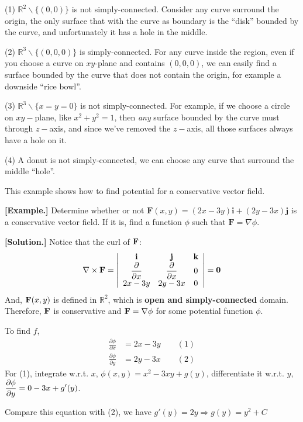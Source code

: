 \documentclass[11pt, a4paper]{MATH2023}
\newcommand{\eg}{\textbf{[Example.] }}
\newcommand{\sol}{\textbf{[Solution.] }}
\newcommand{\ii}{{\bf i}}
\newcommand{\jj}{{\bf j}}
\newcommand{\kk}{{\bf k}}
\newcommand{\FF}{{\bf F}}
\newcommand{\pt}{\partial}
\begin{document}
\begin{spacing}{1.3}
    (1) $\mathbb{R}^2\backslash \{(0,0)\}$ is not simply-connected. Consider any curve surround the origin,
    the only surface that with the curve as boundary is the ``disk'' bounded by the curve, and unfortunately 
    it has a hole in the middle.

    (2) $\mathbb{R}^3\backslash \{(0,0,0)\}$ is simply-connected. For any curve inside the region, even if 
    you choose a curve on $xy$-plane and contains $(0,0,0)$, we can easily find a surface bounded by the 
    curve that does not contain the origin, for example a downside ``rice bowl''.

    (3) $\mathbb{R}^3\backslash \{x=y=0\}$ is not simply-connected. For example, if we choose a circle on 
    $xy-$plane, like $x^2+y^2=1$, then {\it any} surface bounded by the curve must through $z-$axis,
    and since we've removed the $z-$axis, all those surfaces always have a hole on it.

    (4) A donut is not simply-connected, we can choose any curve that surround the middle ``hole''.


    {\blue This example shows how to find potential for a conservative vector field.}

    \eg Determine whether or not $\mathbf{F}(x, y)=(2 x-3 y) \mathbf{i}+(2 y-3 x) \mathbf{j}$ 
    is a conservative vector field. If it is, find a function $\phi$ such that $\mathbf{F}=\nabla \phi$.

    \sol Notice that the curl of $\FF$:
    $$\nabla \times \FF=\left|\begin{array}{ccc}
        \ii & \jj & \kk \\
        \dfrac{\pt}{\pt x} & \dfrac{\pt}{\pt x} & 0\\
        2x-3y & 2y-3x & 0
    \end{array} \right|={\bf 0}$$
    And, $\FF(x,y)$ is defined in $\mathbb{R}^2$, which is {\bf open and simply-connected} domain.
    Therefore, $\FF$ is conservative and $\FF=\nabla \phi$ for some potential function $\phi$.

    To find $f$,
    \begin{align*}
        \frac{\pt \phi}{\pt x} &= 2x-3y\qquad (1)\\
        \frac{\pt \phi}{\pt y} &= 2y-3x\qquad (2)
    \end{align*}
    For (1), integrate w.r.t. $x$, $\phi(x,y)=x^2-3xy+g(y)$, differentiate it w.r.t. $y$,
    $\disp \frac{\pt \phi}{\pt y}=0-3x+g'(y)$.

    Compare this equation with (2), we have $g'(y)=2y \Rightarrow g(y)=y^2+C$


\end{spacing}
\end{document}
